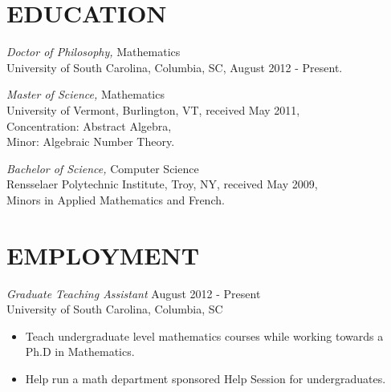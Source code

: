 \documentclass[line,margin]{res}
\begin{document}
\address{2420 Monroe Street}
\address{Columbia, SC 29205}

\begin{resume}
  
  
  \section{EDUCATION} 
          {\sl Doctor of Philosophy,} Mathematics\\
          University of South Carolina, Columbia, SC, 
          August 2012 - Present.
          
          {\sl Master of Science,} Mathematics\\
          University of Vermont, Burlington, VT, 
          received May 2011,\\
          Concentration: Abstract Algebra,\\
          Minor: Algebraic Number Theory.

          {\sl Bachelor of Science,} Computer Science \\
          Rensselaer Polytechnic Institute, Troy, NY, 
          received May 2009,\\
          Minors in Applied Mathematics and French.\\

          \section{EMPLOYMENT}
                  {\sl Graduate Teaching Assistant} \hfill August 2012 - Present \\
                  University of South Carolina, Columbia, SC\\
                  \begin{itemize}  \itemsep -2pt %
                  \item
                    Teach undergraduate level mathematics courses while working towards a Ph.D in Mathematics.
                  \item 
                    Help run a math department sponsored Help Session for undergraduates.
                  \end{itemize}
                  

\end{resume}
\end{document}
